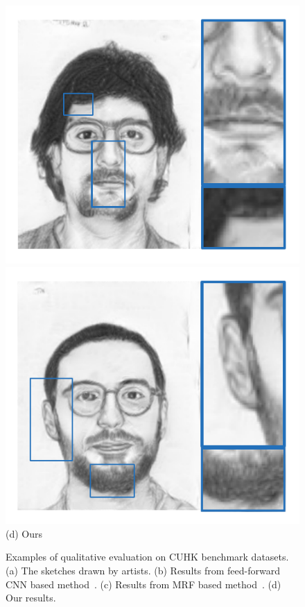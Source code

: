 \documentclass[10pt,twocolumn,letterpaper]{article}
\begin{document}
\begin{figure}[htbp]
\begin{minipage}[t]{0.138\linewidth}
\includegraphics[width=0.99\linewidth]{img/example3_ours.pdf}
\includegraphics[width=0.99\linewidth]{img/example4_ours.pdf}
(d) Ours
\end{minipage}
\caption{Examples of qualitative evaluation on CUHK benchmark datasets. (a) The sketches drawn by artists. (b) Results from feed-forward CNN based method~\cite{zhang2015end}. (c) Results from MRF based method~\cite{wang2009face}. (d) Our results.}
\label{fig:q_eval_1}
\end{figure}
\end{document}
